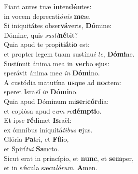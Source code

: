 \evenverse Fiant aures tuæ \textbf{in}ten\textbf{dén}tes:~\*\\
\evenverse in vocem deprecati\textit{ó}\textit{nis} \textbf{me}æ.\\
\oddverse Si iniquitátes obser\textbf{vá}veris, \textbf{Dó}mine:~\*\\
\oddverse Dómine, quis \textit{su}\textit{sti}\textbf{né}bit?\\
\evenverse Quia apud te propiti\textbf{á}ti\textbf{o} est:~\*\\
\evenverse et propter legem tuam sustínu\textit{i} \textit{te}, \textbf{Dó}\textbf{mi}ne.\\
\oddverse Sustínuit ánima mea in \textbf{ver}bo \textbf{e}jus:~\*\\
\oddverse sperávit ánima me\textit{a} \textit{in} \textbf{Dó}\textbf{mi}no.\\
\evenverse A custódia matutína \textbf{us}que ad \textbf{no}ctem:~\*\\
\evenverse speret Isra\textit{ël} \textit{in} \textbf{Dó}\textbf{mi}no.\\
\oddverse Quia apud Dóminum mi\textbf{se}ri\textbf{cór}dia:~\*\\
\oddverse et copiósa apud e\textit{um} \textit{re}\textbf{dém}\textbf{pti}o.\\
\evenverse Et ipse \textbf{ré}dimet \textbf{Is}raël:~\*\\
\evenverse ex ómnibus iniquitá\textit{ti}\textit{bus} \textbf{e}jus.\\
\oddverse Glória \textbf{Pa}tri, et \textbf{Fí}lio,~\*\\
\oddverse et Spirí\textit{tu}\textit{i} \textbf{San}cto.\\
\evenverse Sicut erat in princípio, et \textbf{nunc}, et \textbf{sem}per,~\*\\
\evenverse et in sǽcula sæcu\textit{ló}\textit{rum}. \textbf{A}men.\\
